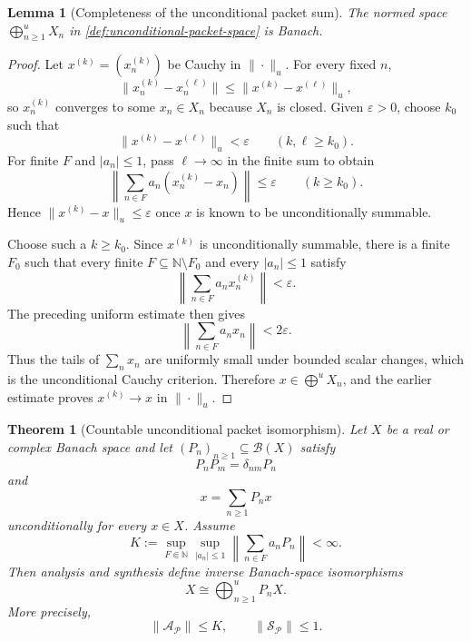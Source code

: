 \documentclass[11pt]{article}
\newtheorem{theorem}{Theorem}[section]
\newtheorem{lemma}[lemma]{Lemma}
\theoremstyle{definition}
\theoremstyle{remark}
\theoremstyle{definition}\newtheorem{example}[theorem]{Example}
\newcommand{\Pcal}{\mathcal P}
\newcommand{\RecordID}[1]{\label{record:#1}}
\newcommand{\Depends}[1]{}
\newcommand{\Exports}[1]{}
\begin{document}
\begin{lemma}[Completeness of the unconditional packet sum]
\label{lem:unconditional-completeness}
The normed space $\bigoplus_{n\geq1}^{u}X_n$ in \cref{def:unconditional-packet-space} is Banach.
\end{lemma}
\RecordID{PSC-I-L-UNCONDITIONAL-COMPLETENESS}
\Depends{PSC-I-D-UNCONDITIONAL-PACKET-SPACE.}

\begin{proof}
Let $x^{(k)}=(x_n^{(k)})$ be Cauchy in $\|\cdot\|_u$.  For every fixed $n$,
\[
\|x_n^{(k)}-x_n^{(\ell)}\|
\leq
\|x^{(k)}-x^{(\ell)}\|_u,
\]
so $x_n^{(k)}$ converges to some $x_n\in X_n$ because $X_n$ is closed.  Given $\varepsilon>0$, choose $k_0$ such that
\[
\|x^{(k)}-x^{(\ell)}\|_u<\varepsilon
\qquad(k,\ell\geq k_0).
\]
For finite $F$ and $|a_n|\leq1$, pass $\ell\to\infty$ in the finite sum to obtain
\[
\left\|\sum_{n\in F}a_n(x_n^{(k)}-x_n)\right\|
\leq\varepsilon
\qquad(k\geq k_0).
\]
Hence $\|x^{(k)}-x\|_u\leq\varepsilon$ once $x$ is known to be unconditionally summable.

Choose such a $k\geq k_0$.  Since $x^{(k)}$ is unconditionally summable, there is a finite $F_0$ such that every finite $F\subseteq\mathbb N\setminus F_0$ and every $|a_n|\leq1$ satisfy
\[
\left\|\sum_{n\in F}a_nx_n^{(k)}\right\|<\varepsilon.
\]
The preceding uniform estimate then gives
\[
\left\|\sum_{n\in F}a_nx_n\right\|<2\varepsilon.
\]
Thus the tails of $\sum_nx_n$ are uniformly small under bounded scalar changes, which is the unconditional Cauchy criterion.  Therefore $x\in\bigoplus^uX_n$, and the earlier estimate proves $x^{(k)}\to x$ in $\|\cdot\|_u$.
\end{proof}

\begin{theorem}[Countable unconditional packet isomorphism]
\label{thm:countable-packets}
Let $X$ be a real or complex Banach space and let $(P_n)_{n\geq1}\subseteq\mathcal B(X)$ satisfy
\[
P_nP_m=\delta_{nm}P_n
\]
and
\[
x=\sum_{n\geq1}P_nx
\]
unconditionally for every $x\in X$.  Assume
\[
K:=
\sup_{F\Subset\mathbb N}
\sup_{|a_n|\leq1}
\left\|\sum_{n\in F}a_nP_n\right\|<\infty.
\]
Then analysis and synthesis define inverse Banach-space isomorphisms
\[
\boxed{
X\cong\bigoplus_{n\geq1}^{u}P_nX.
}
\]
More precisely,
\[
\|\mathcal A_{\Pcal}\|\leq K,
\qquad
\|\mathcal S_{\Pcal}\|\leq1.
\]
\end{theorem}
\RecordID{PSC-I-T-COUNTABLE-UNCONDITIONAL-PACKETS}
\Depends{PSC-I-D-UNCONDITIONAL-PACKET-SPACE and PSC-I-L-UNCONDITIONAL-COMPLETENESS.}
\Exports{Countable analytic packet decompositions under explicit convergence control.}
\end{document}
